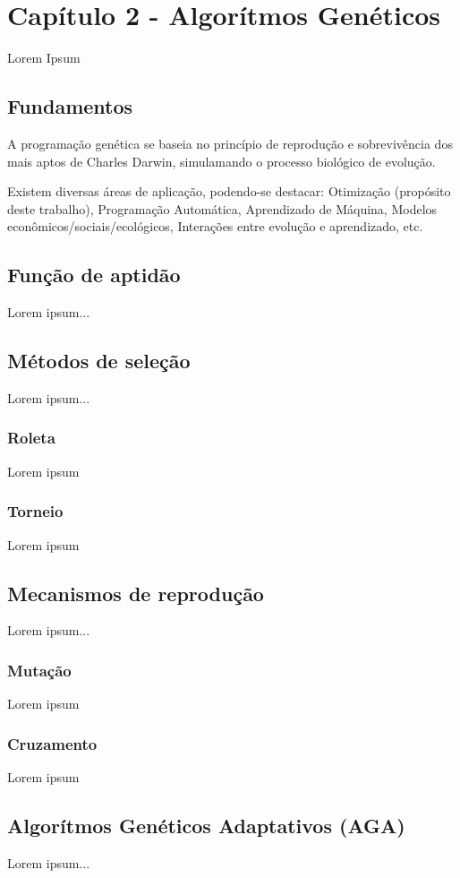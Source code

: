 
\newpage
\section{Capítulo 2 - Algorítmos Genéticos}
\label{sec:capitulo_2}
Lorem Ipsum

\subsection{Fundamentos}
\label{sub:fundamentos}
A programação genética se baseia no princípio de reprodução e sobrevivência dos mais aptos de Charles Darwin, simulamando o processo biológico de evolução.

Existem diversas áreas de aplicação, podendo-se destacar: Otimização (propósito deste trabalho), Programação Automática, Aprendizado de Máquina, Modelos econômicos/sociais/ecológicos, Interações entre evolução e aprendizado, etc.

\subsection{Função de aptidão}
\label{sub:funcao_de_aptidao}
Lorem ipsum...

\subsection{Métodos de seleção}
\label{sub:metodos_de_selecao}
Lorem ipsum...

    \subsubsection{Roleta}
    \label{ssub:roleta}
    Lorem ipsum

    \subsubsection{Torneio}
    \label{ssub:torneio}
    Lorem ipsum

\subsection{Mecanismos de reprodução}
\label{sub:mecanismos_de_reproducao}
Lorem ipsum...

    \subsubsection{Mutação}
    \label{ssub:mutacao}
    Lorem ipsum

    \subsubsection{Cruzamento}
    \label{ssub:cruzamento}
    Lorem ipsum

\subsection{Algorítmos Genéticos Adaptativos (AGA)}
\label{sub:aga}
Lorem ipsum...
